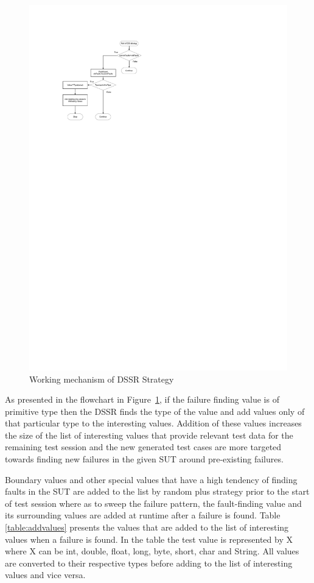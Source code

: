 \documentclass{acm_proc_article-sp}
\begin{document}
\begin{figure}[ht]
\centering
\includegraphics[width=\columnwidth]{flowchart1.pdf}
\caption{Working mechanism of DSSR Strategy}
\label{fig:Working_DSSS}
\end{figure}

As presented in the flowchart in Figure~\ref{fig:Working_DSSS}, if the failure finding value is of primitive type then the DSSR finds the type of the value and add values only of that particular type to the interesting values. Addition of these values increases the size of the list of interesting values that provide relevant test data for the remaining test session and the new generated test cases are more targeted towards finding new failures in the given SUT around pre-existing failures.

Boundary values and other special values that have a high tendency of finding faults in the SUT are added to the list by random plus strategy prior to the start of test session where as to sweep the failure pattern, the fault-finding value and its surrounding values are added at runtime after a failure is found. Table \ref{table:addvalues} presents the values that are added to the list of interesting values when a failure is found. In the table the test value is represented by X where X can be int, double, float, long, byte, short, char and String. All values are converted to their respective types before adding to the list of interesting values and vice versa.
\end{document}
